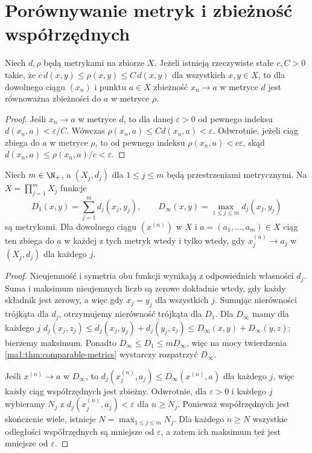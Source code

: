 \section{Porównywanie metryk i zbieżność współrzędnych}
\begin{twierdzenie}
\label{ma1:thm:comparable-metrics}
Niech $d,\rho$ będą metrykami na zbiorze $X$. Jeżeli istnieją rzeczywiste stałe $c,C>0$ takie, że $c\,d(x,y)\le\rho(x,y)\le C\,d(x,y)$ dla wszystkich $x,y\in X$, to dla dowolnego ciągu $(x_n)$ i punktu $a\in X$ zbieżność $x_n\to a$ w metryce $d$ jest równoważna zbieżności do $a$ w metryce $\rho$.
\end{twierdzenie}
\begin{proof}
Jeśli $x_n\to a$ w metryce $d$, to dla danej $\varepsilon>0$ od pewnego indeksu $d(x_n,a)<\varepsilon/C$. Wówczas $\rho(x_n,a)\le C d(x_n,a)<\varepsilon$. Odwrotnie, jeżeli ciąg zbiega do $a$ w metryce $\rho$, to od pewnego indeksu $\rho(x_n,a)<c\varepsilon$, skąd $d(x_n,a)\le \rho(x_n,a)/c<\varepsilon$.
\end{proof}
\begin{twierdzenie}
\label{ma1:thm:finite-coordinate-convergence}
Niech $m\in\N_+$, a $(X_j,d_j)$ dla $1\le j\le m$ będą przestrzeniami metrycznymi. Na $X=\prod_{j=1}^m X_j$ funkcje
\[
 D_1(x,y)=\sum_{j=1}^m d_j(x_j,y_j),\qquad
 D_\infty(x,y)=\max_{1\le j\le m} d_j(x_j,y_j)
\]
są metrykami. Dla dowolnego ciągu $(x^{(n)})$ w $X$ i $a=(a_1,\ldots,a_m)\in X$ ciąg ten zbiega do $a$ w każdej z tych metryk wtedy i tylko wtedy, gdy $x_j^{(n)}\to a_j$ w $(X_j,d_j)$ dla każdego $j$.
\end{twierdzenie}
\begin{proof}
Nieujemność i symetria obu funkcji wynikają z odpowiednich własności $d_j$. Suma i maksimum nieujemnych liczb są zerowe dokładnie wtedy, gdy każdy składnik jest zerowy, a więc gdy $x_j=y_j$ dla wszystkich $j$. Sumując nierówności trójkąta dla $d_j$, otrzymujemy nierówność trójkąta dla $D_1$. Dla $D_\infty$ mamy dla każdego $j$
$d_j(x_j,z_j)\le d_j(x_j,y_j)+d_j(y_j,z_j)\le D_\infty(x,y)+D_\infty(y,z)$; bierzemy maksimum. Ponadto $D_\infty\le D_1\le mD_\infty$, więc na mocy twierdzenia \ref{ma1:thm:comparable-metrics} wystarczy rozpatrzyć $D_\infty$.

Jeśli $x^{(n)}\to a$ w $D_\infty$, to $d_j(x_j^{(n)},a_j)\le D_\infty(x^{(n)},a)$ dla każdego $j$, więc każdy ciąg współrzędnych jest zbieżny. Odwrotnie, dla $\varepsilon>0$ i każdego $j$ wybieramy $N_j$ z $d_j(x_j^{(n)},a_j)<\varepsilon$ dla $n\ge N_j$. Ponieważ współrzędnych jest skończenie wiele, istnieje $N=\max_{1\le j\le m}N_j$. Dla każdego $n\ge N$ wszystkie odległości współrzędnych są mniejsze od $\varepsilon$, a zatem ich maksimum też jest mniejsze od $\varepsilon$.
\end{proof}
